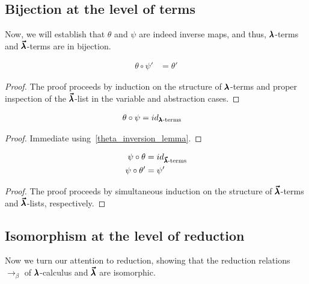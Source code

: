 \subsection{Bijection at the level of terms}

Now, we will establish that $\theta$ and $\psi$ are indeed inverse maps, and thus, $\pmb{\lambda}$-terms and $\pmb{\vec \lambda}$-terms are in bijection.

\begin{lemma}
  \label{theta_inversion_lemma}
  \begin{align*}
    \theta \circ \psi' &= \theta'    
  \end{align*}
\end{lemma}
\begin{proof}
  The proof proceeds by induction on the structure of $\pmb{\lambda}$-terms and proper inspection of the $\pmb{\vec \lambda}$-list in the variable and abstraction cases.
\end{proof}


\begin{theorem}
  \label{theta_psi_inversion}
  \begin{align*}
    \theta \circ \psi &= id_{\pmb{\lambda} \text{-terms}}
  \end{align*}
\end{theorem}
\begin{proof}
  Immediate using~\cref{theta_inversion_lemma}.
\end{proof}


\begin{theorem}
  \label{psi_theta_inversion}
  \begin{align*}
    \psi \circ \theta &= id_{\pmb{\vec \lambda} \text{-terms}} \\
    \psi \circ \theta' &= \psi'    
  \end{align*}
\end{theorem}
\begin{proof}
  The proof proceeds by simultaneous induction on the structure of $\pmb{\vec \lambda}$-terms and $\pmb{\vec \lambda}$-lists, respectively.
\end{proof}


\subsection{Isomorphism at the level of reduction}

Now we turn our attention to reduction, showing that the reduction relations $\to_\beta$ of $\pmb{\lambda}$-calculus and $\pmb{\vec \lambda}$ are isomorphic.


